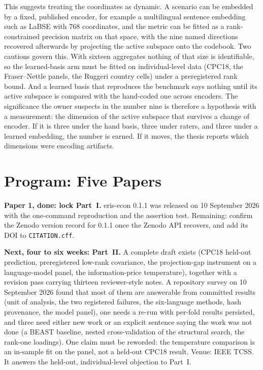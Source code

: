 \documentclass[11pt,onecolumn]{IEEEtran}
\begin{document}
This suggests treating the coordinates as dynamic.
A scenario can be embedded by a fixed, published encoder, for example a multilingual sentence embedding such as LaBSE \cite{feng2022labse} with 768 coordinates, and the metric can be fitted as a rank-constrained precision matrix on that space, with the nine named directions recovered afterwards by projecting the active subspace onto the codebook.
Two cautions govern this.
With sixteen aggregates nothing of that size is identifiable, so the learned-basis arm must be fitted on individual-level data (CPC18, the Fraser--Nettle panels, the Ruggeri country cells) under a preregistered rank bound.
And a learned basis that reproduces the benchmark says nothing until its active subspace is compared with the hand-coded one across encoders.
The significance the owner suspects in the number nine is therefore a hypothesis with a measurement: the dimension of the active subspace that survives a change of encoder.
If it is three under the hand basis, three under raters, and three under a learned embedding, the number is earned.
If it moves, the thesis reports which dimensions were encoding artifacts.

\section{Program: Five Papers}

\textbf{Paper 1, done: lock Part~I.}
eris-econ 0.1.1 was released on 10 September 2026 with the one-command reproduction and the assertion test.
Remaining: confirm the Zenodo version record for 0.1.1 once the Zenodo API recovers, and add its DOI to \texttt{CITATION.cff}.

\textbf{Next, four to six weeks: Part~II.}
A complete draft exists (CPC18 held-out prediction, preregistered low-rank covariance, the projection-gap instrument on a language-model panel, the information-price temperature), together with a revision pass carrying thirteen reviewer-style notes.
A repository survey on 10 September 2026 found that most of them are answerable from committed results (unit of analysis, the two registered failures, the six-language methods, hash provenance, the model panel), one needs a re-run with per-fold results persisted, and three need either new work or an explicit sentence saying the work was not done (a BEAST baseline, nested cross-validation of the structural search, the rank-one loadings).
One claim must be reworded: the temperature comparison is an in-sample fit on the panel, not a held-out CPC18 result.
Venue: IEEE TCSS.
It answers the held-out, individual-level objection to Part~I.
\end{document}
